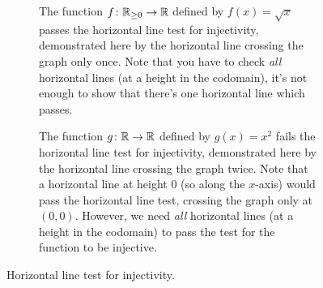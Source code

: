 \documentclass[fleqn]{LectureClass/LectureClass}
\begin{document}
    \begin{figure}
        \centering
        \begin{subfigure}{0.9 \textwidth}
            \centering
            \caption[\(y = \sqrt{x}\) passes the injective horizontal line test.]{The function \(f \colon \mathbb{R}_{\ge0} \to \mathbb{R}\) defined by \(f(x) = \sqrt{x}\) passes the horizontal line test for injectivity, demonstrated here by the horizontal line crossing the graph only once. Note that you have to check \emph{all} horizontal lines (at a height in the codomain), it's not enough to show that there's one horizontal line which passes.}
            \label{fig:sqrt x injective}
        \end{subfigure}
        
        \begin{subfigure}{0.9\textwidth}
            \centering
            \caption[\(y = x^2\) fails the injective horizontal line test.]{The function \(g \colon \mathbb{R} \to \mathbb{R}\) defined by \(g(x) = x^2\) fails the horizontal line test for injectivity, demonstrated here by the horizontal line crossing the graph twice. Note that a horizontal line at height \(0\) (so along the \(x\)-axis) would pass the horizontal line test, crossing the graph only at \((0, 0)\). However, we need \emph{all} horizontal lines (at a height in the codomain) to pass the test for the function to be injective.}
            \label{fig:x squared not injective}
        \end{subfigure}
        \caption{Horizontal line test for injectivity.}
    \end{figure}
    
\end{document}
